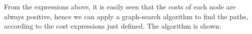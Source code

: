 \documentclass[graybox]{svmult}
\begin{document}
From the expressions above, it is easily seen that the costs of each node are always positive, hence we can apply a graph-search algorithm to find the paths, according to the cost expressions just defined. The algorithm is shown: 

\begin{algorithm}

\end{algorithm}



\end{document}
